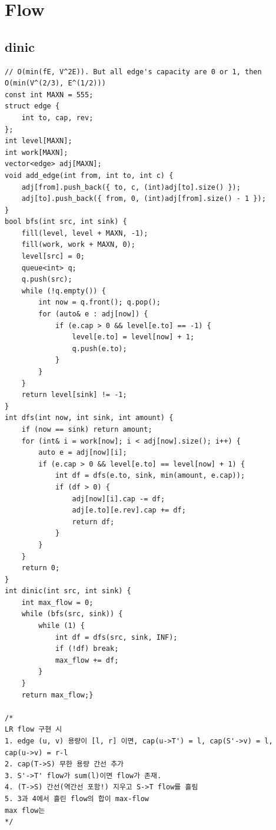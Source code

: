 \documentclass[landscape, 8pt, a4paper, oneside, twocolumn]{extarticle}
\begin{document}
\newpage
\section{Flow}
\subsection {dinic}
\begin{verbatim}
// O(min(fE, V^2E)). But all edge's capacity are 0 or 1, then O(min(V^(2/3), E^(1/2)))
const int MAXN = 555;
struct edge {
    int to, cap, rev;
};
int level[MAXN];
int work[MAXN];
vector<edge> adj[MAXN];
void add_edge(int from, int to, int c) {
    adj[from].push_back({ to, c, (int)adj[to].size() });
    adj[to].push_back({ from, 0, (int)adj[from].size() - 1 });
}
bool bfs(int src, int sink) {
    fill(level, level + MAXN, -1);
    fill(work, work + MAXN, 0);
    level[src] = 0;
    queue<int> q;
    q.push(src);
    while (!q.empty()) {
        int now = q.front(); q.pop();
        for (auto& e : adj[now]) {
            if (e.cap > 0 && level[e.to] == -1) {
                level[e.to] = level[now] + 1;
                q.push(e.to);
            }
        }
    }
    return level[sink] != -1;
}
int dfs(int now, int sink, int amount) {
    if (now == sink) return amount;
    for (int& i = work[now]; i < adj[now].size(); i++) {
        auto e = adj[now][i];
        if (e.cap > 0 && level[e.to] == level[now] + 1) {
            int df = dfs(e.to, sink, min(amount, e.cap));
            if (df > 0) {
                adj[now][i].cap -= df;
                adj[e.to][e.rev].cap += df;
                return df;
            }
        }
    }
    return 0;
}
int dinic(int src, int sink) {
    int max_flow = 0;
    while (bfs(src, sink)) {
        while (1) {
            int df = dfs(src, sink, INF);
            if (!df) break;
            max_flow += df;
        }
    }
    return max_flow;}

/*
LR flow 구현 시
1. edge (u, v) 용량이 [l, r] 이면, cap(u->T') = l, cap(S'->v) = l, cap(u->v) = r-l
2. cap(T->S) 무한 용량 간선 추가
3. S'->T' flow가 sum(l)이면 flow가 존재.
4. (T->S) 간선(역간선 포함!) 지우고 S->T flow를 흘림
5. 3과 4에서 흘린 flow의 합이 max-flow
max flow는 
*/

\end{verbatim}
\end{document}
